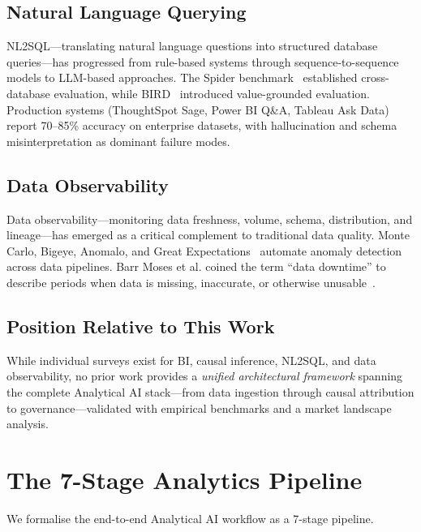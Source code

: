 \documentclass[12pt, a4paper]{article}
\begin{document}
\subsection{Natural Language Querying}
NL2SQL---translating natural language questions into structured database queries---has progressed from rule-based systems through sequence-to-sequence models to LLM-based approaches. The Spider benchmark~\citep{yu2018spider} established cross-database evaluation, while BIRD~\citep{li2024bird} introduced value-grounded evaluation. Production systems (ThoughtSpot Sage, Power BI Q\&A, Tableau Ask Data) report 70--85\% accuracy on enterprise datasets, with hallucination and schema misinterpretation as dominant failure modes.

\subsection{Data Observability}
Data observability---monitoring data freshness, volume, schema, distribution, and lineage---has emerged as a critical complement to traditional data quality. Monte Carlo, Bigeye, Anomalo, and Great Expectations~\citep{greatexpectations2023} automate anomaly detection across data pipelines. Barr Moses et al. coined the term ``data downtime'' to describe periods when data is missing, inaccurate, or otherwise unusable~\citep{moses2022data}.

\subsection{Position Relative to This Work}
While individual surveys exist for BI, causal inference, NL2SQL, and data observability, no prior work provides a \emph{unified architectural framework} spanning the complete Analytical AI stack---from data ingestion through causal attribution to governance---validated with empirical benchmarks and a market landscape analysis.

\section{The 7-Stage Analytics Pipeline}\label{sec:pipeline}

We formalise the end-to-end Analytical AI workflow as a 7-stage pipeline.
\end{document}
